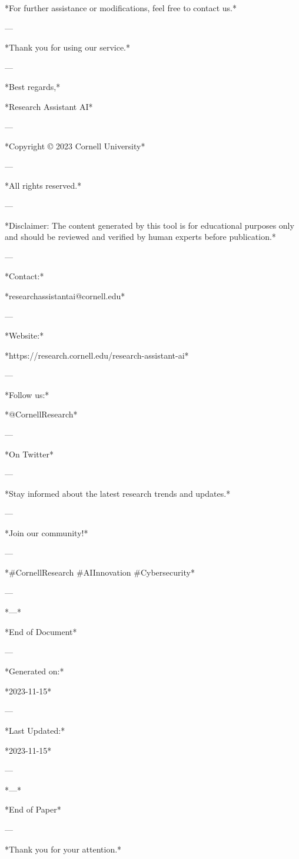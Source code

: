 *For further assistance or modifications, feel free to contact us.* 

--- 

*Thank you for using our service.* 

--- 

*Best regards,* 

*Research Assistant AI* 

--- 

*Copyright © 2023 Cornell University* 

--- 

*All rights reserved.* 

--- 

*Disclaimer: The content generated by this tool is for educational purposes only and should be reviewed and verified by human experts before publication.* 

--- 

*Contact:* 

*researchassistantai@cornell.edu* 

--- 

*Website:* 

*https://research.cornell.edu/research-assistant-ai* 

--- 

*Follow us:* 

*@CornellResearch* 

--- 

*On Twitter* 

--- 

*Stay informed about the latest research trends and updates.* 

--- 

*Join our community!* 

--- 

*#CornellResearch #AIInnovation #Cybersecurity* 

--- 

*---* 

*End of Document* 

--- 

*Generated on:* 

*2023-11-15* 

--- 

*Last Updated:* 

*2023-11-15* 

--- 

*---* 

*End of Paper* 

--- 

*Thank you for your attention.* 

